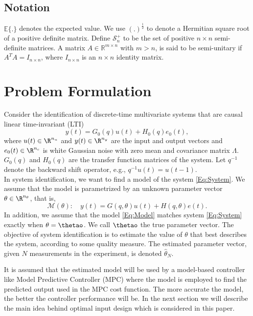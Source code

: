 \documentclass{ifacconf}
\begin{document}
\subsection{Notation}
 $\mathbb{E}\{.\}$ denotes the expected value. We use $( . ) ^{\frac{1}{2}}$ to denote a Hermitian square root of a positive definite matrix. Define $\mathcal{S}^+_n$ to be the set of positive $n \times n$ semi-definite matrices. A matrix $A \in \mathbb{R}^{m \times n}$ with $m>n$, is said to be semi-unitary if $A^T A = I_{n \times n}$, where $I_{n \times n}$ is an $n \times n$ identity matrix.
\section{Problem Formulation}
\label{Sec:Problem Formulation}
Consider the identification of discrete-time multivariate systems that are causal linear time-invariant (LTI)
\begin{equation} \label{Eq:System}
				y(t) = G_0(q)u(t) + H_0(q)e_0(t),
\end{equation}
where $u(t) \in \R^{n_u}$ and $y(t)\in\R^{n_y}$ are the input and output vectors and $e_0(t)\in\R^{n_e}$ is white Gaussian noise with zero mean and covariance matrix $\Lambda$. $G_0(q)$ and $H_0(q)$ are the transfer function matrices of the system. Let $q^{-1}$ denote the backward shift operator, e.g., $q^{-1}u(t) = u(t-1)$.
\\
In system identification, we want to find a model of the system \eqref{Eq:System}. We assume that the model is parametrized by an unknown parameter vector $\theta \in \R^{n_\theta}$, that is,
\begin{equation}  \label{Eq:Model}
	\mathcal{M}(\theta): \quad		y(t) = G(q,\theta)u(t) + H(q,\theta)e(t).
\end{equation}
In addition, we assume that the model \eqref{Eq:Model} matches system \eqref{Eq:System} exactly when $\theta=\thetao$. We call $\thetao$ the true parameter vector. The objective of system identification is to estimate the value of $\theta$ that best describes the system, according to some quality measure. The estimated parameter vector, given $N$ measurements in the experiment, is denoted $\hat{\theta}_N$.

It is assumed that the estimated model will be used by a model-based controller like Model Predictive Controller (MPC) where the model is employed to find the predicted output used in the MPC cost function. The more accurate the model, the better the controller performance will be. In the next section we will describe the main idea behind optimal input design which is considered in this paper.
\end{document}
